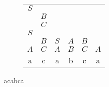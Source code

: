 \documentclass{article}
\begin{document}
\begin{figure}[!ht]
  \begin{subfigure}[h]{0.4\textwidth}
    \centering
    \begin{tabular}{|*6{c|}}
    \cline{1-1}
    $S$&\multicolumn{4}{c}{}\\
    \cline{1-2}
    &$B$&\multicolumn{3}{c}{}\\
    \cline{1-3}
    &$C$&&\multicolumn{2}{c}{}\\
    \cline{1-4}
    $S$&&&&\multicolumn{1}{c}{}\\
    \cline{1-5}
    &$B$&$S$&$A$&$B$\\
    \cline{1-6}
    $A$&$C$&$A$&$B$&$C$&$A$\\
    \hline
    a&c&a&b&c&a\\
    \end{tabular}
  \end{subfigure}
  \hfill
  \begin{subfigure}[h]{0.4\textwidth}
    \centering
  \end{subfigure}
  \caption{acabca}
\end{figure}
\end{document}
